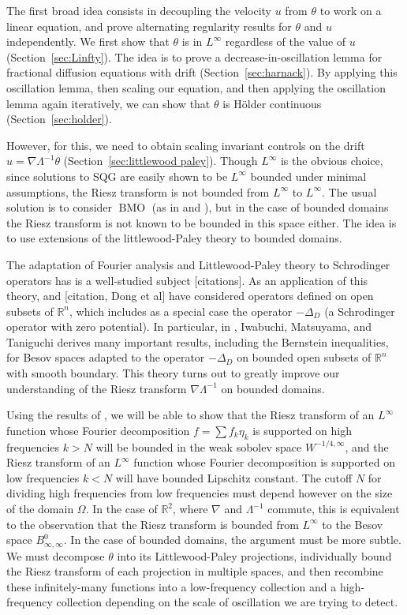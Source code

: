 \documentclass[11pt]{amsart}
\theoremstyle{remark}
\theoremstyle{definition}
\newcommand{\R}{\mathbb{R}}
\DeclareMathOperator{\BMO}{BMO}
\newcommand{\grad}{\nabla}
\newcommand{\Laplace}{\Delta}
\newcommand{\eigen}[1]{\eta_{#1}} %
\begin{document}
 The first broad  idea consists in decoupling the  velocity $u$ from  $\theta$ to work on  a linear equation, and prove alternating regularity results for $\theta$ and $u$ independently.  We first show that $\theta$ is in $L^\infty$ regardless of the value of $u$ (Section~\ref{sec:Linfty}). The idea is to prove a decrease-in-oscillation lemma for fractional diffusion equations with  drift (Section~\ref{sec:harnack}).  By applying this oscillation lemma, then scaling our equation, and then applying the oscillation lemma again iteratively, we can show that $\theta$ is H\"{o}lder continuous (Section~\ref{sec:holder}).  
\vskip0.3cm

However, for this, we need to obtain scaling invariant controls on the drift   $u = \grad \Lambda^{-1} \theta$ (Section~\ref{sec:littlewood paley}).  Though $L^\infty$ is the obvious choice, since solutions to SQG are easily shown to be $L^\infty$ bounded under minimal assumptions, the Riesz transform is not bounded from $L^\infty$ to $L^\infty$.  The usual solution is to consider $\BMO$ (as in \cite{CaVa.sqg} and \cite{NoVa.qg}), but in the case of bounded domains the Riesz transform is not known to be bounded in this space either.  The idea is to use extensions of the littlewood-Paley theory to bounded domains. 

The adaptation of Fourier analysis and Littlewood-Paley theory to Schrodinger operators has is a well-studied subject [citations].  As an application of this theory, \cite{IMTs} and [citation, Dong et al] have considered operators defined on open subsets of $\R^n$, which includes as a special case the operator $-\Delta_D$ (a Schrodinger operator with zero potential).  In particular, in \cite{IMTb},  Iwabuchi, Matsuyama, and Taniguchi derives many important results, including the Bernstein inequalities, for Besov spaces adapted to the operator $-\Laplace_D$ on bounded open subsets of $\R^n$ with smooth boundary.  This theory turns out to greatly improve our understanding of the Riesz transform $\grad \Lambda^{-1}$ on bounded domains.  


Using the results of \cite{IMTb}, we will be able to show that the Riesz transform of an $L^\infty$ function whose Fourier decomposition $f = \sum f_k \eigen{k}$ is supported on high frequencies $k > N$ will be bounded in the weak sobolev space $W^{-1/4,\infty}$, and the Riesz transform of an $L^\infty$ function whose Fourier decomposition is supported on low frequencies $k<N$ will have bounded Lipschitz constant.  The cutoff $N$ for dividing high frequencies from low frequencies must depend however on the size of the domain $\Omega$.  In the case of $\R^2$, where $\grad$  and $\Lambda^{-1}$ commute, this is equivalent to the observation that the Riesz transform is bounded from $L^\infty$ to the Besov space $B_{\infty,\infty}^0$.  In the case of bounded domains, the argument must be more subtle.  We must decompose $\theta$ into its Littlewood-Paley projections, individually bound the Riesz transform of each projection in multiple spaces, and then recombine these infinitely-many functions into a low-frequency collection and a high-frequency collection depending on the scale of oscillation we are trying to detect.  
\end{document}

